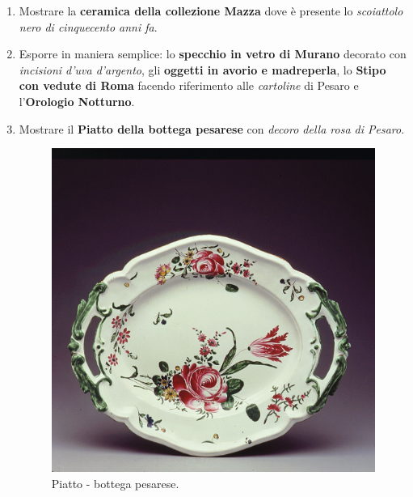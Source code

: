 \documentclass[12pt,a4paper]{article}
\begin{document}
\begin{enumerate}
	\item Mostrare la \textbf{ceramica della collezione Mazza} dove è presente lo \textit{scoiattolo nero di cinquecento anni fa}.
	\item Esporre in maniera semplice: lo \textbf{specchio in vetro di Murano} decorato con \textit{incisioni d'uva d'argento},  gli \textbf{oggetti in avorio e madreperla}, lo \textbf{Stipo con vedute di Roma} facendo riferimento alle \textit{cartoline} di Pesaro e l'\textbf{Orologio Notturno}.
	\item Mostrare il \textbf{Piatto della bottega pesarese} con \textit{decoro della rosa di Pesaro}.
	\begin{figure}[h]
		\centering
		\includegraphics[]{Piatto_pesaro.jpg}
		\caption{Piatto - bottega pesarese.}
	\end{figure}
	

\end{enumerate}
\end{document}
